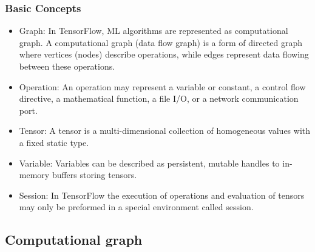 \begin{frame}
  \MyLogo
  \frametitle{Basic Concepts}
  \begin{itemize}
	  	\item Graph: In TensorFlow, ML algorithms are represented as computational graph. A computational graph (data flow graph) is a form of directed graph where vertices (nodes) describe operations, while edges represent data flowing between these operations.
	  	
	  	\item Operation: An operation may represent a variable or constant, a control flow directive, a mathematical function, a file I/O, or a network communication port.
	  	
	  	\item Tensor: A tensor is a multi-dimensional collection of homogeneous values with a fixed static type.
	  	
	  	\item Variable: Variables can be described as persistent, mutable handles to in-memory buffers storing tensors.
	  	
	  	\item Session: In TensorFlow the execution of operations and evaluation of tensors may only be preformed in a special environment called session.
	  	
\end{itemize}

\end{frame}

\subsection{Computational graph}

